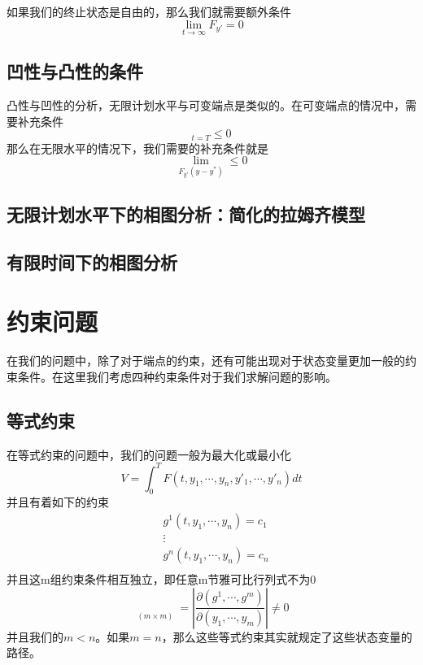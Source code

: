 \documentclass[UTF8,12pt]{ctexart}
\numberwithin{equation}{section} %
\numberwithin{figure}{section}
\numberwithin{table}{section}
\begin{document}
	如果我们的终止状态是自由的，那么我们就需要额外条件
	\begin{equation}
		\lim\limits_{t \to \infty}F_{y'} = 0
	\end{equation}
	
	\subsection{凹性与凸性的条件}
	凸性与凹性的分析，无限计划水平与可变端点是类似的。在可变端点的情况中，需要补充条件
	\begin{equation}
		[F_{y'}(y - y^*)]_{t = T} \leqslant 0
	\end{equation}
	那么在无限水平的情况下，我们需要的补充条件就是
	\begin{equation}
		\lim\limits_{F_{y'}(y - y^*)} \leqslant 0
	\end{equation}
	
	\subsection{无限计划水平下的相图分析：简化的拉姆齐模型}
	
	\subsection{有限时间下的相图分析}
	
	
	\newpage
	
	\section{约束问题}
	在我们的问题中，除了对于端点的约束，还有可能出现对于状态变量更加一般的约束条件。在这里我们考虑四种约束条件对于我们求解问题的影响。
	
	\subsection{等式约束}
	在等式约束的问题中，我们的问题一般为最大化或最小化
	\begin{equation}
		V = \int_{0}^{T}F(t,y_1,\cdots,y_n,y'_1,\cdots,y'_n)dt
	\end{equation}
	并且有着如下的约束
	\begin{equation}
		\begin{aligned}
			&g^1(t,y_1,\cdots,y_n) = c_1 \\
			&\vdots \\
			&g^n(t,y_1,\cdots,y_n) = c_n \\
		\end{aligned}
	\end{equation}
	并且这m组约束条件相互独立，即任意m节雅可比行列式不为0
	\begin{equation}
		\mathop{|J|}\limits_{(m\times m)} = |\frac{\partial (g^1,\cdots,g^m)}{\partial (y_1,\cdots,y_m)}| \neq 0
	\end{equation}
	并且我们的$m < n$。如果$m = n$，那么这些等式约束其实就规定了这些状态变量的路径。
	
\end{document}
